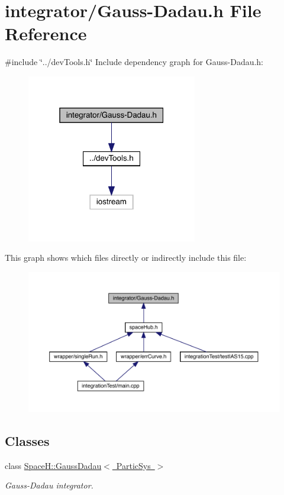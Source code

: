 \hypertarget{_gauss-_dadau_8h}{}\section{integrator/\+Gauss-\/\+Dadau.h File Reference}
\label{_gauss-_dadau_8h}
{\ttfamily \#include \char`\"{}../dev\+Tools.\+h\char`\"{}}\newline
Include dependency graph for Gauss-\/\+Dadau.h\+:
\nopagebreak
\begin{figure}[H]
\begin{center}
\leavevmode
\includegraphics[width=211pt]{_gauss-_dadau_8h__incl}
\end{center}
\end{figure}
This graph shows which files directly or indirectly include this file\+:
\nopagebreak
\begin{figure}[H]
\begin{center}
\leavevmode
\includegraphics[width=350pt]{_gauss-_dadau_8h__dep__incl}
\end{center}
\end{figure}
\subsection*{Classes}
\begin{DoxyCompactItemize}
\item 
class \mbox{\hyperlink{class_space_h_1_1_gauss_dadau}{Space\+H\+::\+Gauss\+Dadau$<$ Partic\+Sys $>$}}
\begin{DoxyCompactList}\small\item\em Gauss-\/\+Dadau integrator. \end{DoxyCompactList}\end{DoxyCompactItemize}
